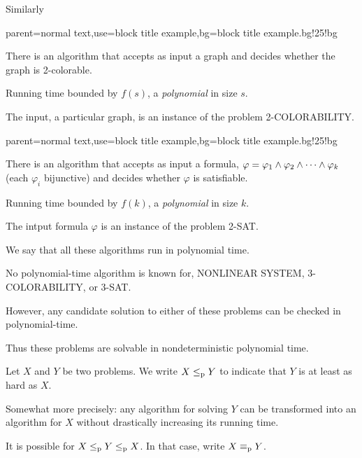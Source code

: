 \documentclass[12pt,xcolor=dvipsnames,mathserif%
   ]{beamer}
\newcommand{\bigpause}{\pause\bigskip}
\renewcommand{\.}{\cdot}
\newcommand{\reduc}{\leq_{\text{\textnormal{p}}}}
\newcommand{\equivp}{\equiv_{\text{\textnormal{p}}}}
\renewcommand{\phi}{\ensuremath{\varphi}}
\begin{document}
\begin{frame}
  Similarly

  {parent=normal text,use=block title example,bg=block title example.bg!25!bg}
  \begin{exampleblock}{}
    There is an algorithm that accepts as input a graph and decides
    whether the graph is 2-colorable.

    \smallskip
    Running time bounded by $f(s)$, a \emph{polynomial} in 
    size $s$.
  \end{exampleblock}

  The \alert{input}, a particular graph, is an \alert{instance} of the \alert{problem} 
  2-COLORABILITY.
\end{frame}


\begin{frame}
  {parent=normal text,use=block title example,bg=block title example.bg!25!bg}
  \begin{exampleblock}{}
  There is an algorithm that accepts as input a formula, $\phi = \phi_1 \meet \phi_2 \meet \cdots \meet \phi_k$ (each $\phi_i$ bijunctive) and decides whether $\phi$ is satisfiable.
  
  \smallskip
  Running time bounded by $f(k)$, a \emph{polynomial} in size $k$.
  \end{exampleblock}
  
  The \alert{intput} formula $\phi$ is an \alert{instance} of the \alert{problem} 2-SAT.

  We say that all these algorithms run in \alert{polynomial time}.
\end{frame}

\begin{frame}
  No polynomial-time algorithm is known for, NONLINEAR SYSTEM,
  3-COLORABILITY, or 3-SAT.

  \bigpause
  However, any candidate solution to either of these problems can be
  checked in polynomial-time. 

  \bigpause
  Thus these problems are solvable in \alert{nondeterministic polynomial
    time.} 
\end{frame}

\begin{frame}
  Let $X$ and $Y$ be two problems. We write $X \reduc Y$ to indicate that
  $Y$ is at least as hard as $X$.

  \bigpause
  Somewhat more precisely: any algorithm for solving $Y$ can be
  transformed into an algorithm for $X$ without drastically increasing
  its running time.

  \bigpause
  It is possible for $X\reduc Y \reduc X$. In that case, write $X\equivp
  Y$. 

\end{frame}
\end{document}

